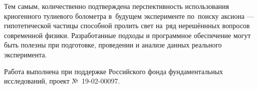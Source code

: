 \documentclass[a4paper,article,14pt]{extarticle}
\begin{document}
Тем самым, количественно подтверждена перспективность использования криогенного тулиевого болометра в~будущем эксперименте по~поиску аксиона --- гипотетической частицы способной пролить свет на~ряд нерешённных вопросов современной физики.
Разработанные подходы и программное обеспечение могут быть полезны при подготовке, проведении и анализе данных реального эксперимента.

Работа выполнена при поддержке Российского фонда фундаментальных исследований, проект №~19-02-00097.


\pagebreak
\printbibliography[title={Источники}]{}
\end{document}
